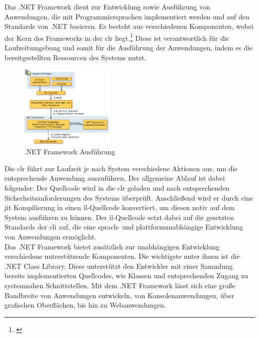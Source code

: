 Das .NET Framework dient zur Entwicklung sowie Ausführung von Anwendungen, die mit Programmiersprachen implementiert werden und auf den Standards von .NET basieren. Es besteht aus verschiedenen Komponenten, wobei der Kern des Frameworks in der \gls{clr} liegt.\footnote{\citep[vgl.][Overview of the .NET Framework]{Microsoft.Overviewof}\label{note7x}} Diese ist verantwortlich für die Laufzeitumgebung und somit für die Ausführung der Anwendungen, indem es die bereitgestellten Ressourcen des Systems nutzt.
\newpage
\begin{figure}
	\begin{center}
		\includegraphics[width=0.4\textwidth]{images/technische_grundlagen/net_aufbau.jpeg}
	\end{center}
	\caption{.NET Framework Ausführung \cite{Microsoft.Introductionto}}
	\label{fig:net}
\end{figure}

\noindent
Die \gls{clr} führt zur Laufzeit je nach System verschiedene Aktionen aus, um die entsprechende Anwendung auszuführen. Der allgemeine Ablauf ist dabei folgender: Der Quellcode wird in die \gls{clr} geladen und nach entsprechenden Sicherheitsanforderungen des Systems überprüft. Anschließend wird er durch eine \gls{jit} Kompilierung in einen \gls{il}-Quellcode konvertiert, um diesen nativ auf dem System ausführen zu können. Der \gls{il}-Quellcode setzt dabei auf die gesetzten Standards der \gls{cli} auf, die eine sprach- und plattformunabhängige Entwicklung von Anwendungen ermöglicht.\\
Das .NET Framework bietet zusätzlich zur unabhängigen Entwicklung verschiedene unterstützende Komponenten. Die wichtigste unter ihnen ist die .NET Class Library. Diese unterstützt den Entwickler mit einer Sammlung bereits implementierten Quellcodes, wie Klassen und entsprechenden Zugang zu systemnahen Schnittstellen. Mit dem .NET Framework lässt sich eine große Bandbreite von Anwendungen entwickeln, von Konsolenanwendungen, über grafischen Oberflächen, bis hin zu Webanwendungen.\\

